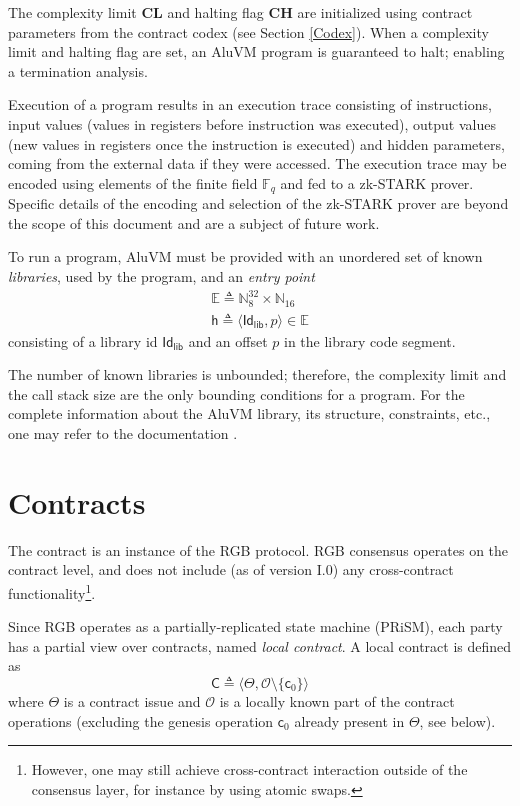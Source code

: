\documentclass[9pt,oneside]{amsart}
\begin{document}
\begin{multicols}{2}
The complexity limit \textbf{CL} and halting flag \textbf{CH}
are initialized using contract parameters from the contract codex (see Section \ref{Codex}).
When a complexity limit and halting flag are set, an AluVM program is guaranteed to halt;
enabling a termination analysis.

Execution of a program results in an execution trace consisting of instructions,
input values (values in registers before instruction was executed),
output values (new values in registers once the instruction is executed)
and hidden parameters, coming from the external data if they were accessed.
The execution trace may be encoded using elements of the finite field $\mathbb{F}_q$
and fed to a zk-STARK prover.
Specific details of the encoding and selection of the zk-STARK prover
are beyond the scope of this document and are a subject of future work.

To run a program, AluVM must be provided with an unordered set of known \emph{libraries},
used by the program, and an \emph{entry point}
\noindent
\begin{gather}\label{eq:e}
\mathbb{E} \triangleq \mathbb{N}^{32}_8 \times \mathbb{N}_{16} \\
\mathsf{h} \triangleq \langle \mathsf{Id_{lib}}, p \rangle \in \mathbb{E}
\end{gather}
\noindent
consisting of a library id $\mathsf{Id_{lib}}$ and an offset $p$ in the library code segment.

The number of known libraries is unbounded; therefore, the complexity limit and the call stack size
are the only bounding conditions for a program.
For the complete information about the AluVM library, its structure, constraints, etc.,
one may refer to the documentation \cite{AluVM}.

\section{Contracts}\label{Contracts}

The contract is an instance of the RGB protocol. RGB consensus operates on the contract level,
and does not include (as of version I.0) any cross-contract functionality\footnote{%
    However, one may still achieve cross-contract interaction outside of the consensus layer,
    for instance by using atomic swaps.}.

Since RGB operates as a partially-replicated state machine (PRiSM),
each party has a partial view over contracts, named \emph{local contract}.
A local contract is defined as
\noindent
\begin{equation}
\mathsf{C} \triangleq \langle \mathsf{\Theta}, \mathcal{O} \setminus \{ \mathsf{c}_0 \} \rangle
\end{equation}
\noindent
where $\Theta$ is a contract issue and
$\mathcal{O}$ is a locally known part of the contract operations
(excluding the genesis operation $\mathsf{c}_0$ already present in $\Theta$, see below).


\end{multicols}
\end{document}
